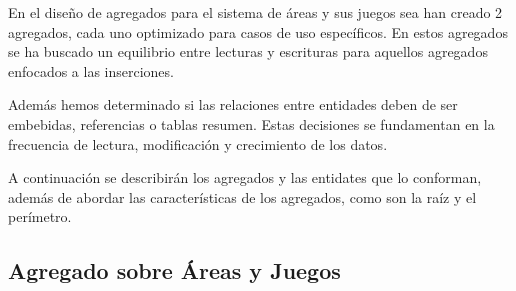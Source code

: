 \documentclass[]{article}
\begin{document}
En el diseño de agregados para el sistema de áreas y sus juegos sea han creado 2 agregados, cada uno optimizado para casos de uso específicos. En estos agregados se ha buscado un equilibrio entre lecturas y escrituras para aquellos agregados enfocados a las inserciones.

Además hemos determinado si las relaciones entre entidades deben de ser embebidas, referencias o tablas resumen. Estas decisiones se fundamentan en la frecuencia de lectura, modificación y crecimiento de los datos.

A continuación se describirán los agregados y las entidates que lo conforman, además de abordar las características de los agregados, como son la raíz y el perímetro.

\subsection{Agregado sobre Áreas y Juegos}
\label{sub_sec:agregado_area_juego}
\end{document}
